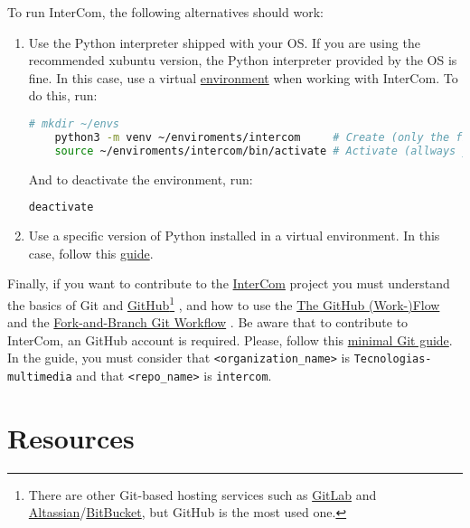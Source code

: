 To run InterCom, the following alternatives should work:
\begin{enumerate}
\item Use the Python interpreter shipped with your OS. If you are
  using the recommended xubuntu version, the Python interpreter
  provided by the OS is fine. In this case, use a virtual
  \href{https://docs.python.org/3/library/venv.html}{environment} when
  working with InterCom. To do this, run:
  \begin{lstlisting}[language=Bash]
    # mkdir ~/envs
    python3 -m venv ~/enviroments/intercom     # Create (only the first time)
    source ~/enviroments/intercom/bin/activate # Activate (allways you run InterCom)
  \end{lstlisting}
  And to deactivate the environment, run:
  \begin{lstlisting}[language=Bash]
    deactivate
  \end{lstlisting}
  
\item Use a specific version of Python installed in a virtual environment. In this case, follow this 
\href{https://vicente-gonzalez-ruiz.github.io/Python_install/}{guide}.

\end{enumerate}

Finally, if you want to contribute to the
\href{https://github.com/Tecnologias-multimedia/intercom}{InterCom}
project \cite{intercom} you must understand the basics of Git
\cite{Git-book} and \href{https://github.com/}{GitHub}\footnote{There
are other Git-based hosting services such as
\href{https://about.gitlab.com/}{GitLab} and
\href{https://www.atlassian.com/git}{Altassian}/\href{https://bitbucket.org/product}{BitBucket},
but GitHub is the most used one.} \cite{GitHub}, and how to use the
\href{https://guides.github.com/introduction/flow/index.html}{The
  GitHub (Work-)Flow} and the
\href{https://github.com/vicente-gonzalez-ruiz/fork_and_branch_git_workflow}{Fork-and-Branch
  Git Workflow} \cite{fork-and-branch-git-workflow}. Be aware that to
contribute to InterCom, an GitHub account is required. Please, follow
this
\href{https://vicente-gonzalez-ruiz.github.io/using_GitHub/}{minimal
  Git guide}. In the guide, you must consider that
\texttt{<organization\_name>} is \texttt{Tecnologias-multimedia} and
that \texttt{<repo\_name>} is \texttt{intercom}.

\section{Resources}


